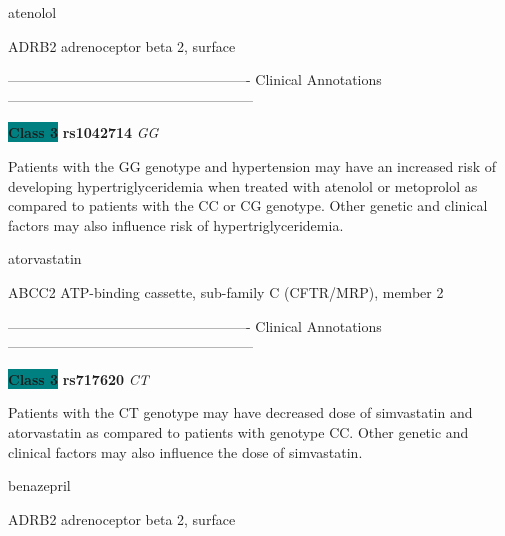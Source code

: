 \documentclass{resume} %
\begin{document}
\begin{rSection}{ atenolol }
\begin{rSubsection}{ ADRB2 }{ adrenoceptor beta 2, surface }{}{}
\item[]

\item[] ---------------------------------------------------- Clinical Annotations -----------------------------------------------------\newline
\item \textbf{\colorbox{teal} {Class 3}} \textbf{ rs1042714 } \textit{ GG }
\item[] Patients with the GG genotype and hypertension may have an increased risk of developing hypertriglyceridemia when treated with atenolol or metoprolol as compared to patients with the CC or CG genotype. Other genetic and clinical factors may also influence risk of hypertriglyceridemia. 
\end{rSubsection}

\end{rSection}\begin{rSection}{ atorvastatin }
\item[]

\begin{rSubsection}{ ABCC2 }{ ATP-binding cassette, sub-family C (CFTR/MRP), member 2 }{}{}
\item[]

\item[] ---------------------------------------------------- Clinical Annotations -----------------------------------------------------\newline
\item \textbf{\colorbox{teal} {Class 3}} \textbf{ rs717620 } \textit{ CT }
\item[] Patients with the CT genotype may have decreased dose of simvastatin and atorvastatin as compared to patients with genotype CC. Other genetic and clinical factors may also influence the dose of simvastatin.
\end{rSubsection}

\end{rSection}\begin{rSection}{ benazepril }
\item[]

\begin{rSubsection}{ ADRB2 }{ adrenoceptor beta 2, surface }{}{}
\item[]


\end{rSubsection}
\end{rSection}
\end{document}

